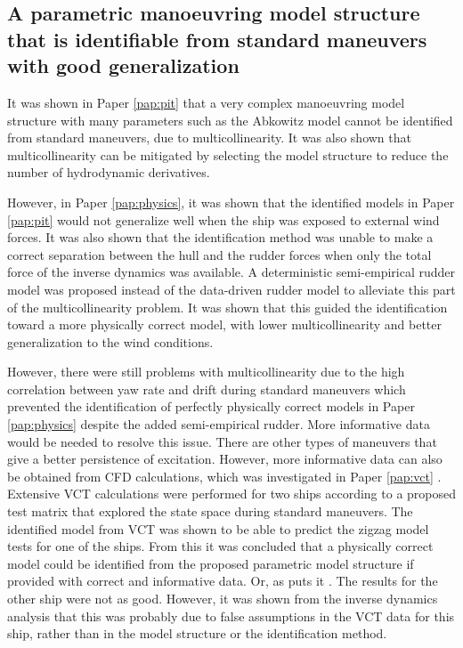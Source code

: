 \subsection*{A parametric manoeuvring model structure that is identifiable from standard maneuvers with good generalization}
It was shown in Paper \ref{pap:pit}  that a very complex manoeuvring model structure with many parameters such as the Abkowitz model cannot be identified from standard maneuvers, due to multicollinearity.  
It was also shown that multicollinearity can be mitigated by selecting the model structure to reduce the number of hydrodynamic derivatives.

However, in Paper \ref{pap:physics}, it was shown that the identified models in Paper \ref{pap:pit} would not generalize well when the ship was exposed to external wind forces. 
It was also shown that the identification method was unable to make a correct separation between the hull and the rudder forces when only the total force of the inverse dynamics was available. 
A deterministic semi-empirical rudder model was proposed instead of the data-driven rudder model to alleviate this part of the multicollinearity problem. It was shown that this guided the identification toward a more physically correct model, with lower multicollinearity and better generalization to the wind conditions. 

However, there were still problems with multicollinearity due to the high correlation between yaw rate and drift during standard maneuvers which prevented the identification of perfectly physically correct models in Paper \ref{pap:physics} despite the added semi-empirical rudder. More informative data would be needed to resolve this issue. There are other types of maneuvers that give a better persistence of excitation. However, more informative data can also be obtained from CFD calculations, which was investigated in Paper \ref{pap:vct} . Extensive VCT calculations were performed for two ships according to a proposed test matrix that explored the state space during standard maneuvers.
The identified model from VCT was shown to be able to predict the zigzag model tests for one of the ships. From this it was concluded that a physically correct model could be identified from the proposed parametric model structure if provided with correct and informative data. Or, as \textcite{revestidoherreroTwostepIdentificationNonlinear2012} puts it .
The results for the other ship were not as good.  However, it was shown from the inverse dynamics analysis that this was probably due to false assumptions in the VCT data for this ship, rather than in the model structure or the identification method.  

